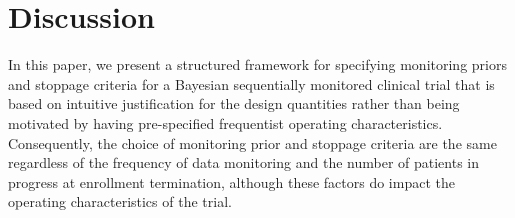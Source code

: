 \documentclass[12pt]{article}
\begin{document}
\section{Discussion}\label{sec:discussion}
In this paper, we present a structured framework for specifying monitoring priors and stoppage criteria for a Bayesian sequentially monitored clinical trial that is based on intuitive justification for the design quantities rather than being motivated by having pre-specified frequentist operating characteristics.
%
%
%
%
%
Consequently, the choice of monitoring prior and stoppage criteria are the same regardless of the frequency of data monitoring and the number of patients in progress at enrollment termination, although these factors do impact the operating characteristics of the trial.
%
\end{document}
